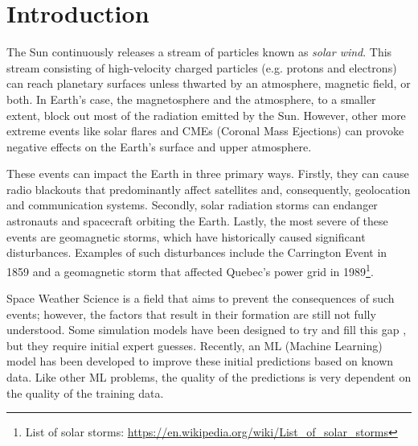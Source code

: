 \chapter{Introduction} \label{chap:intro}

The Sun continuously releases a stream of particles known as \textit{solar wind}. This stream consisting of high-velocity charged particles (e.g. protons and electrons) can reach planetary surfaces unless thwarted by an atmosphere, magnetic ﬁeld, or both. In Earth's case, the magnetosphere and the atmosphere, to a smaller extent, block out most of the radiation emitted by the Sun. However, other more extreme events like solar flares and CMEs (Coronal Mass Ejections) can provoke negative effects on the Earth's surface and upper atmosphere. 

These events can impact the Earth in three primary ways. Firstly, they can cause radio blackouts that predominantly affect satellites and, consequently, geolocation and communication systems. Secondly, solar radiation storms can endanger astronauts and spacecraft orbiting the Earth. Lastly, the most severe of these events are geomagnetic storms, which have historically caused significant disturbances. Examples of such disturbances include the Carrington Event in 1859 and a geomagnetic storm that affected Quebec's power grid in 1989\footnote{List of solar storms: \url{https://en.wikipedia.org/wiki/List_of_solar_storms}}.

Space Weather Science is a field that aims to prevent the consequences of such events; however, the factors that result in their formation are still not fully understood. Some simulation models have been designed to try and fill this gap \cite{pinto.rouillard_MultipleFluxtubeSolar_2017, odstrcil.pizzo_ThreedimensionalPropagationCoronal_1999}, but they require initial expert guesses. Recently, an ML (Machine Learning) model has been developed \cite{barros_InitialConditionEstimation_} to improve these initial predictions based on known data. Like other ML problems, the quality of the predictions is very dependent on the quality of the training data.


